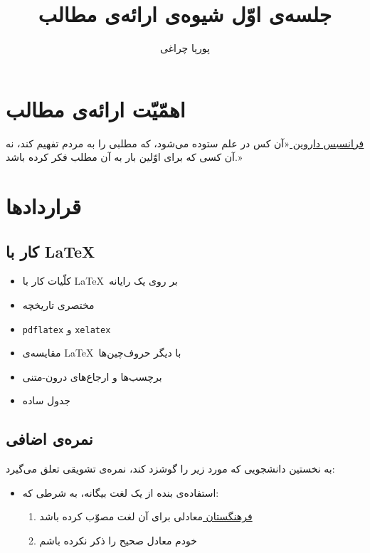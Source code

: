\documentclass{article}
\begin{document}
\title{جلسه‌ی اوّل شیوه‌ی ارائه‌ی مطالب}
\author{پوریا چراغی}
\maketitle
\section{اهمّیّت ارائه‌ی مطالب}
\begin{pquotation}{\href{https://fa.wikipedia.org/wiki/\%D9\%81\%D8\%B1\%D8\%A7\%D9\%86\%D8\%B3\%DB\%8C\%D8\%B3\_\%D8\%AF\%D8\%A7\%D8\%B1\%D9\%88\%DB\%8C\%D9\%86}{فرانسیس داروین }} 
«آن کس در علم ستوده می‌شود، که مطلبی را به مردم تفهیم کند، نه آن کسی که برای اوّلین بار به آن مطلب فکر کرده باشد.»
\end{pquotation}
\section{قرارداد‌ها}
\subsection{کار با \LaTeX}
\begin{itemize}
\item کلّیات کار با \LaTeX~بر روی یک رایانه
\item مختصری تاریخچه
\item \texttt{pdflatex} و \texttt{xelatex}
\item مقایسه‌ی \LaTeX~با دیگر حروف‌چین‌ها
\item برچسب‌ها و ارجاع‌های درون-متنی
\item جدول ساده
\end{itemize}
\subsection{نمره‌ی اضافی}
به نخستین دانشجویی که مورد زیر را گوشزد کند،‌ نمره‌ی تشویقی تعلق می‌گیرد:
\begin{itemize}
\item استفاده‌ی بنده از یک لغت بیگانه، به شرطی که:
\begin{enumerate}
\item \href{https://wiki.apll.ir/word/index.php/%d8%b5%d9%81%d8%ad%d9%87%d9%94_%d8%a7%d8%b5%d9%84%db%8c}{فرهنگستان }معادلی برای آن لغت مصوّب کرده باشد
\item خودم معادل صحیح را ذکر نکرده باشم
\end{enumerate}
\end{itemize}
\end{document}
